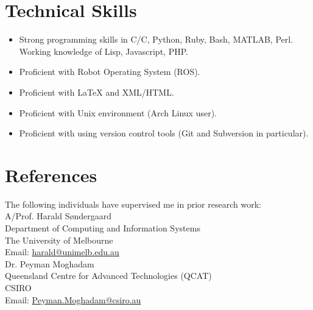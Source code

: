 \documentclass[12pt,a4paper]{article}
\newcommand{\mailto}[1]{\href{mailto:#1}{\url{#1}} }
\newcommand{\CPP}
{C\nolinebreak[4]\hspace{-.05em}\raisebox{.22ex}{\footnotesize\bf ++ }}
\begin{document}
\section*{Technical Skills}
\begin{itemize}
  \item Strong programming skills in C/\CPP, Python, Ruby, Bash, MATLAB,
    Perl. Working knowledge of Lisp, Javascript, PHP. 
  \item Proficient with Robot Operating System (ROS).
	\item Proficient with {\LaTeX} and XML/HTML.
  \item Proficient with Unix environment (Arch Linux user).
  \item Proficient with using version control tools (Git and Subversion in
    particular).
\end{itemize}

\section*{References}
The following individuals have supervised me in prior research work: \\

\noindent
A/Prof. Harald S\o ndergaard  \\
Department of Computing and Information Systems \\
The University of Melbourne \\
Email: \mailto{harald@unimelb.edu.au} \\

\noindent
Dr. Peyman Moghadam \\
Queensland Centre for Advanced Technologies (QCAT) \\
CSIRO \\
Email: \mailto{Peyman.Moghadam@csiro.au} \\
\end{document}
